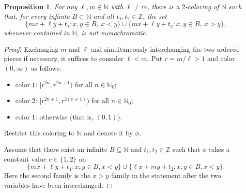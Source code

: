 \documentclass[reqno,12pt]{amsart}
\newtheorem{prop}[thm]{Proposition}
\newcommand{\Nzero}{\mathbb N_0}
\def \N {\mathbb N}
\numberwithin{equation}{section}
\begin{document}
\begin{prop}\label{prop6-2}
For any $\ell,m\in \N$ with $\ell\neq m$, there is a $2$-coloring of
$\N$ such that, for every infinite $B\subset\N$ and all
$t_1,t_2\in\mathbb Z$, the set
\[
\{mx+\ell y+t_1:x,y\in B,\ x<y\}
\cup
\{mx+\ell y+t_2:x,y\in B,\ x>y\},
\]
whenever contained in $\N$, is not monochromatic.
\end{prop}
\begin{proof}
Exchanging $m$ and $\ell$ and simultaneously interchanging the two ordered
pieces if necessary, it suffices to consider $\ell<m$. Put
$r=m/\ell>1$ and color $(0,\infty)$ as follows:
\begin{itemize}
	\item color $1$: $[r^{2n},r^{2n+1})$ for all $n\in\Nzero$;
	\item color $2$: $[r^{2n+1},r^{2(n+1)})$ for all $n\in\Nzero$;
	\item color $1$: otherwise (that is, $(0,1)$).
\end{itemize}
Restrict this coloring to $\N$ and denote it by $\phi$.

\medskip
Assume that there exist an infinite $B\subseteq \N$ and
$t_1,t_2\in\mathbb Z$ such that $\phi$ takes a constant value
$c\in\{1,2\}$ on
\[
\{mx+\ell y+t_1:x,y\in B,x<y\}
\cup\{\ell x+my+t_2:x,y\in B,x<y\}.
\]
Here the second family is the $x>y$ family in the statement after the two
variables have been interchanged.


\end{proof}
\end{document}
